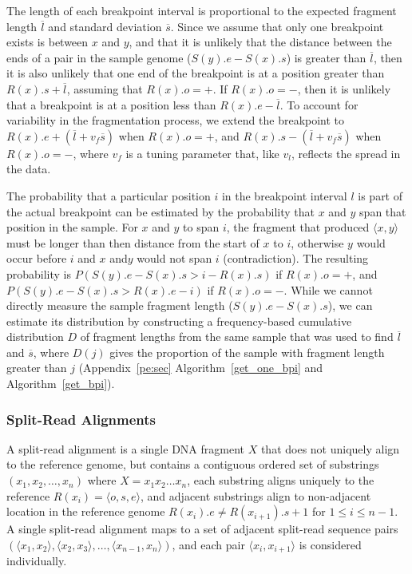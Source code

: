 \documentclass[10pt]{bmc_article}
\newenvironment{bmcformat}{\begin{raggedright}\baselineskip20pt\sloppy\setboolean{publ}{false}}{\end{raggedright}\baselineskip20pt\sloppy}
\begin{document}
\begin{bmcformat}
The length of each breakpoint interval is proportional to the expected fragment
length $\overline{l}$ and standard deviation $\overline{s}$.  Since we assume
that only one breakpoint exists is between $x$ and $y$, and that it is unlikely
that the distance between the ends of a pair in the sample genome ($S(y).e -
S(x).s$) is greater than $\overline{l}$, then it is also unlikely that one end
of the breakpoint is at a position greater than $R(x).s + \overline{l}$,
assuming that $R(x).o=+$. If $R(x).o=-$, then it is unlikely that a breakpoint
is at a position less than $R(x).e - \overline{l}$.  To account for variability
in the fragmentation process, we extend the breakpoint to
$R(x).e + (\overline{l} + v_f\overline{s})$ when $R(x).o=+$, and
$R(x).s - (\overline{l} + v_f\overline{s})$ when $R(x).o=-$,
where $v_f$ is a tuning parameter that, like $v_l$, reflects the spread in the
data.

The probability that a particular position $i$ in the breakpoint interval $l$ is
part of the actual breakpoint can be estimated by the probability that $x$ and
$y$ span that position in the sample. For $x$ and $y$ to span $i$, the fragment
that produced $\langle x,y \rangle$ must be longer than then distance from the
start of $x$ to $i$, otherwise $y$ would occur before $i$ and $x$ and$y$ would
not span $i$ (contradiction).  The resulting probability is
$P(S(y).e - S(x).s > i - R(x).s)$ if $R(x).o=+$, and
$P(S(y).e - S(x).s > R(x).e - i)$ if $R(x).o=-$.
While we cannot directly measure the sample fragment length ($S(y).e - S(x).s$),
we can estimate its distribution by constructing a frequency-based cumulative
distribution $D$ of fragment lengths from the same sample that was used to find
$\overline{l}$ and $\overline{s}$, where $D(j)$ gives the proportion of the
sample with fragment length greater than $j$ (Appendix~\ref{pe:sec}
Algorithm~\ref{get_one_bpi} and Algorithm~\ref{get_bpi}).

\subsubsection*{Split-Read Alignments}

A split-read alignment is a single DNA fragment $X$ that does not uniquely align
to the reference genome, but contains a contiguous ordered set of substrings
$(x_1, x_2, \dots, x_n)$ where $X=x_1x_2\dots x_n$, each substring aligns
uniquely to the reference $R(x_i)=\langle o,s,e \rangle$, and adjacent
substrings align to non-adjacent location in the reference genome
$R(x_{i}).e \neq R(x_{i+1}).s + 1$ for $1\leq i \leq n-1$. A single split-read
alignment maps to a set of adjacent split-read sequence pairs
$(\langle x_1 , x_2 \rangle, \langle x_2, x_3 \rangle, \dots ,
\langle x_{n-1},x_n \rangle)$, and each pair $\langle x_i,x_{i+1} \rangle$ is
considered individually.


\end{bmcformat}
\end{document}
